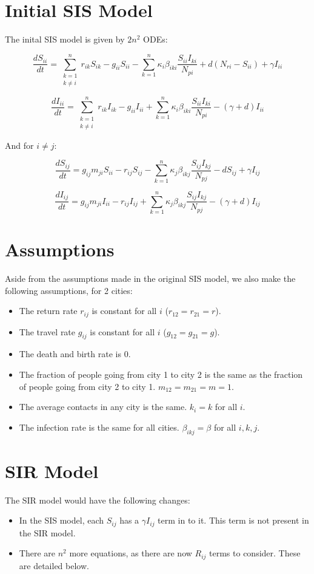 \documentclass[11pt]{article}
\begin{document}
\section{Initial SIS Model}
The inital SIS model is given by $2n^2$ ODEs:

\[
\frac{dS_{ii}}{dt} = \sum_{\substack{k=1 \\ k\neq i}}^{n} r_{ik} S_{ik} - g_{ii} S_{ii} - \sum_{k=1}^{n} \kappa_i \beta_{iki} \frac{S_{ii} I_{ki}}{N_{pi}} + d (N_{ri} - S_{ii}) + \gamma I_{ii}
\]

\[
\frac{dI_{ii}}{dt} = \sum_{\substack{k=1 \\ k\neq i}}^{n} r_{ik} I_{ik} - g_{ii} I_{ii} + \sum_{k=1}^{n} \kappa_i \beta_{iki} \frac{S_{ii} I_{ki}}{N_{pi}} - (\gamma + d) I_{ii}
\]

And for $i \neq j$:

\[
\frac{dS_{ij}}{dt} = g_{ij} m_{ji} S_{ii} - r_{ij} S_{ij} - \sum_{k=1}^{n} \kappa_j \beta_{ikj} \frac{S_{ij} I_{kj}}{N_{pj}} - d S_{ij} + \gamma I_{ij}
\]

\[
\frac{dI_{ij}}{dt} = g_{ij} m_{ji} I_{ii} - r_{ij} I_{ij} + \sum_{k=1}^{n} \kappa_j \beta_{ikj} \frac{S_{ij} I_{kj}}{N_{pj}} - (\gamma + d) I_{ij}
\]



\section{Assumptions}
Aside from the assumptions made in the original SIS model, we also make the following assumptions, for 2 cities:
\begin{itemize}

    \item The return rate $r_{ij}$ is constant for all $i$ ($r_{12} = r_{21} = r$).
    \item The travel rate $g_{ij}$ is constant for all $i$ ($g_{12} = g_{21} = g$).
    \item The death and birth rate is 0.
    \item The fraction of people going from city 1 to city 2 is the same as the fraction of people going from city 2 to city 1. $m_{12} = m_{21} = m = 1$.
    \item The average contacts in any city is the same. $k_i = k$ for all $i$.
    \item The infection rate is the same for all cities. $\beta_{ikj} = \beta$ for all $i, k, j$.
\end{itemize}

\section{SIR Model}
The SIR model would have the following changes:
\begin{itemize}
    \item In the SIS model, each $S_{ij}$ has a $\gamma I_{ij}$ term in to it. This term is not present in the SIR model.
    \item There are $n^2$ more equations, as there are now $R_{ij}$ terms to consider. These are detailed below.
\end{itemize}
\end{document}

